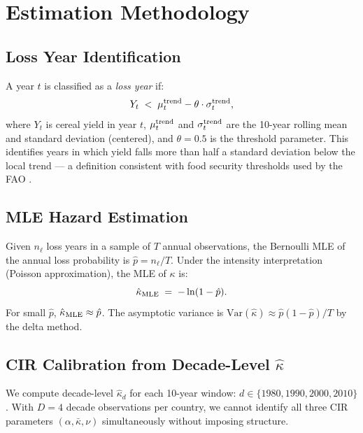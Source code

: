 \documentclass[12pt,a4paper]{article}
\newcommand{\khat}{\hat{\kappa}}
\newcommand{\kbar}{\bar{\kappa}}
\begin{document}
\section{Estimation Methodology}
\label{sec:estimation}

\subsection{Loss Year Identification}

A year $t$ is classified as a \emph{loss year} if:
\begin{equation}
  Y_t \;<\; \mu_t^{\rm trend} - \theta \cdot \sigma_t^{\rm trend},
  \label{eq:loss_year}
\end{equation}
where $Y_t$ is cereal yield in year $t$, $\mu_t^{\rm trend}$ and $\sigma_t^{\rm trend}$
are the 10-year rolling mean and standard deviation (centered), and $\theta=0.5$ is
the threshold parameter.
This identifies years in which yield falls more than half a standard deviation below
the local trend — a definition consistent with food security thresholds used by the
FAO \citep{FAO2020}.

\subsection{MLE Hazard Estimation}

Given $n_\ell$ loss years in a sample of $T$ annual observations, the Bernoulli MLE
of the annual loss probability is $\hat{p} = n_\ell/T$.
Under the intensity interpretation (Poisson approximation), the MLE of $\kappa$ is:
\begin{equation}
  \khat_{\rm MLE} \;=\; -\ln(1-\hat{p}).
  \label{eq:kappa_mle}
\end{equation}
For small $\hat{p}$, $\khat_{\rm MLE}\approx\hat{p}$.
The asymptotic variance is $\text{Var}(\khat)\approx\hat{p}(1-\hat{p})/T$ by the
delta method.

\subsection{CIR Calibration from Decade-Level $\khat$}

We compute decade-level $\khat_d$ for each 10-year window:
$d\in\{1980,1990,2000,2010\}$.
With $D=4$ decade observations per country, we cannot identify all three CIR parameters
$(\alpha,\kbar,\nu)$ simultaneously without imposing structure.
\end{document}
